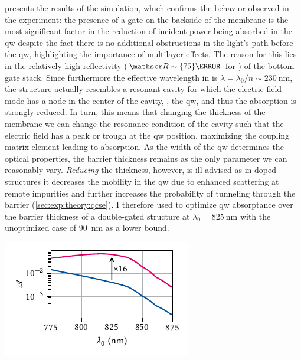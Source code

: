  presents the results of the simulation, which confirms the behavior observed in the experiment: the presence of a gate on the backside of the membrane is the most significant factor in the reduction of incident power being absorbed in the \gls{qw} despite the fact there is no additional obstructions in the light's path before the \gls{qw}, highlighting the importance of multilayer effects.
The reason for this lies in the relatively high reflectivity ($\reflectance\sim\qty{75}{\percent}$ for ) of the bottom gate stack.
Since furthermore the effective wavelength in  is $\lambda = \lambda_0/n\sim\qty{230}{\nano\meter}$, the structure actually resembles a resonant cavity for which the electric field mode has a node in the center of the cavity, \ie, the \gls{qw}, and thus the absorption is strongly reduced.
In turn, this means that changing the thickness of the membrane we can change the resonance condition of the cavity such that the electric field has a peak or trough at the \gls{qw} position, maximizing the coupling matrix element leading to absorption.
As the width of the \gls{qw} determines the optical properties, the  barrier thickness remains as the only parameter we can reasonably vary.
\emph{Reducing} the thickness, however, is ill-advised as in doped structures it decreases the mobility in the \gls{qw} due to enhanced scattering at remote impurities and further increases the probability of tunneling through the barrier (\cf \cref{sec:exp:theory:qcse}).
I therefore used \pymoosh to optimize \gls{qw} absorptance over the barrier thickness of a double-gated structure at $\lambda_0 = \qty{825}{\nano\meter}$ with the unoptimized case of \qty{90}{\nano\meter} as a lower bound.

\begin{marginfigure}[*-5]
    \centering
    \includegraphics{img/pdf/experiment/tmm_absorptance}
    \caption[]{
        \Gls{qw} absorptance \absorptance in a heterostructure with default (blue) and optimized (magenta) barrier thickness and top and bottom gates as function of wavelength.
        Optimization was performed at \qty{825}{\nano\meter} using the differential evolution algorithm implemented in \pymoosh, resulting in a barrier thickness of \qty{122}{\nano\meter} and an absorptance better by a factor of \num{16} at \qty{6.3}{\percent}.
    }
    \label{fig:exp:tmm:wavelengths}
\end{marginfigure}


